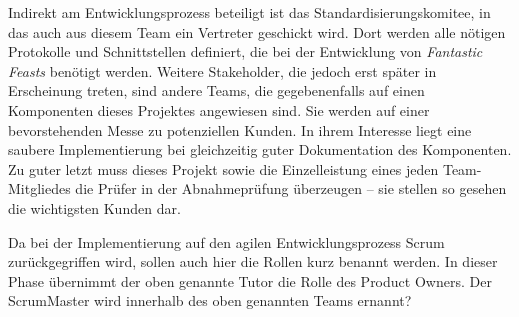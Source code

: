 Indirekt am Entwicklungsprozess beteiligt ist das Standardisierungskomitee, in das auch aus diesem Team ein Vertreter geschickt wird. Dort werden alle nötigen Protokolle und Schnittstellen definiert, die bei der Entwicklung von \textit{Fantastic Feasts} benötigt werden. Weitere Stakeholder, die jedoch erst später in Erscheinung treten, sind andere Teams, die gegebenenfalls auf einen Komponenten dieses Projektes angewiesen sind. Sie werden auf einer bevorstehenden Messe zu potenziellen Kunden. In ihrem Interesse liegt eine saubere Implementierung bei gleichzeitig guter Dokumentation des Komponenten. Zu guter letzt muss dieses Projekt sowie die Einzelleistung eines jeden Team-Mitgliedes die Prüfer in der Abnahmeprüfung überzeugen – sie stellen so gesehen die wichtigsten Kunden dar.

Da bei der Implementierung auf den agilen Entwicklungsprozess Scrum zurückgegriffen wird, sollen auch hier die Rollen kurz benannt werden. In dieser Phase übernimmt der oben genannte Tutor die Rolle des Product Owners. Der ScrumMaster wird innerhalb des oben genannten Teams ernannt?